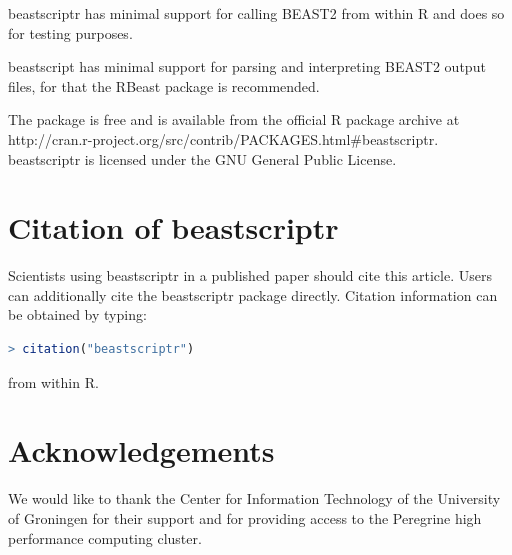 \documentclass{article}
\begin{document}
beastscriptr has minimal support for calling BEAST2 from within R and does
so for testing purposes. 

beastscript has minimal support for parsing and interpreting BEAST2 output files,
for that the RBeast package is recommended.

The package is free and is available from the official R package archive at 
http://cran.r-project.org/src/contrib/PACKAGES.html\#beastscriptr. 
beastscriptr is licensed under the GNU General Public License.


\section{Citation of beastscriptr}

Scientists using beastscriptr in a published paper should cite this
article. Users can additionally cite the beastscriptr package 
directly. Citation information can be obtained by typing:

\begin{lstlisting}[language=R]
> citation("beastscriptr")
\end{lstlisting}

from within R.

\section*{Acknowledgements}

We would like to thank the Center for Information Technology of the University of Groningen for their support
and for providing access to the Peregrine high performance computing cluster.




\begin{thebibliography}{}

\end{thebibliography}
\end{document}
